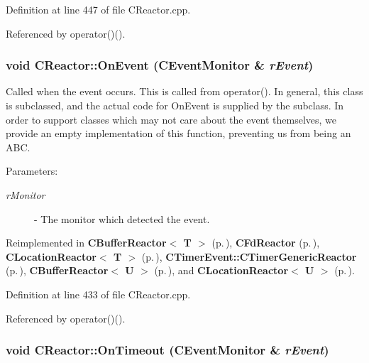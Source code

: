Definition at line 447 of file CReactor.cpp.

Referenced by operator()().
\subsubsection{\setlength{\rightskip}{0pt plus 5cm}void CReactor::On\-Event ({\bf CEvent\-Monitor} \& {\em r\-Event})\hspace{0.3cm}{\tt  [virtual]}}\label{classCReactor_a6}


Called when the event occurs. This is called from operator(). In general, this class is subclassed, and the actual code for On\-Event is supplied by the subclass. In order to support classes which may not care about the event themselves, we provide an empty implementation of this function, preventing us from being an ABC.\begin{Desc}
\item[Parameters: ]\par
\begin{description}
\item[{\em 
r\-Monitor}]- The monitor which detected the event. \end{description}
\end{Desc}


Reimplemented in {\bf CBuffer\-Reactor$<$ T $>$} {\rm (p.\,\pageref{classCBufferReactor_a5})}, {\bf CFd\-Reactor} {\rm (p.\,\pageref{classCFdReactor_a5})}, {\bf CLocation\-Reactor$<$ T $>$} {\rm (p.\,\pageref{classCLocationReactor_a5})}, {\bf CTimer\-Event::CTimer\-Generic\-Reactor} {\rm (p.\,\pageref{classCTimerEvent_1_1CTimerGenericReactor_a2})}, {\bf CBuffer\-Reactor$<$ U $>$} {\rm (p.\,\pageref{classCBufferReactor_a5})}, and {\bf CLocation\-Reactor$<$ U $>$} {\rm (p.\,\pageref{classCLocationReactor_a5})}.

Definition at line 433 of file CReactor.cpp.

Referenced by operator()().
\subsubsection{\setlength{\rightskip}{0pt plus 5cm}void CReactor::On\-Timeout ({\bf CEvent\-Monitor} \& {\em r\-Event})\hspace{0.3cm}{\tt  [virtual]}}\label{classCReactor_a8}


